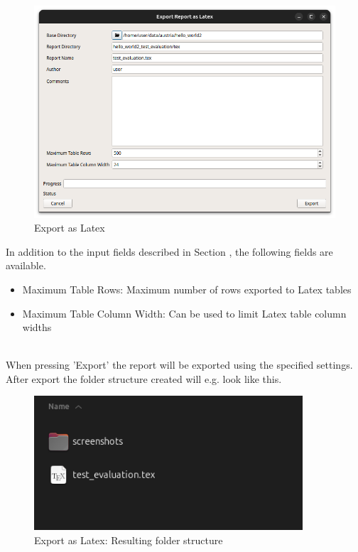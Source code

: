 \begin{figure}[H]
    \hspace*{-2.5cm}
    \center
    \includegraphics[width=12cm,frame]{figures/export_latex.png}
  \caption{Export as Latex}
\end{figure}

In addition to the input fields described in Section , 
the following fields are available.

\begin{itemize}  
    \item Maximum Table Rows: Maximum number of rows exported to Latex tables
    \item Maximum Table Column Width: Can be used to limit Latex table column widths
\end{itemize}
\ \\

When pressing 'Export' the report will be exported using the specified settings.
After export the folder structure created will e.g. look like this.

\begin{figure}[H]
    \hspace*{-2.5cm}
    \center
    \includegraphics[width=10cm,frame]{figures/export_latex_result.png}
  \caption{Export as Latex: Resulting folder structure}
\end{figure}

